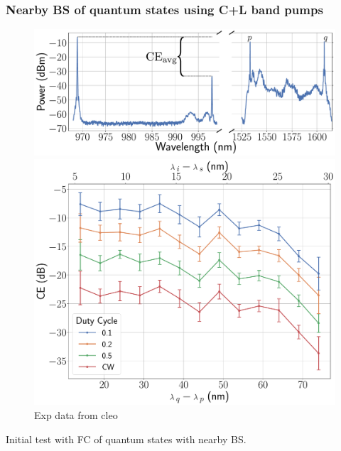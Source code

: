 \documentclass[11pt, headings=optiontoheadandtoc]{article}
\begin{document}
\subsubsection{Nearby BS of quantum states using C+L band pumps}
\begin{figure}[H]
    \centering
    \begin{minipage}{0.5\textwidth}
        \centering
        \includegraphics[width=\textwidth]{./figs/exp_data/spectra.pdf}
    \end{minipage}%
    \begin{minipage}{0.5\textwidth}
        \centering
        \includegraphics[width=\textwidth]{./figs/exp_data/ce_vs_pump_sep.pdf}
    \end{minipage}
    \caption{Exp data from cleo}
    \label{fig:exp_data}
\end{figure}
Initial test with FC of quantum states with nearby BS.

\newpage
\end{document}
